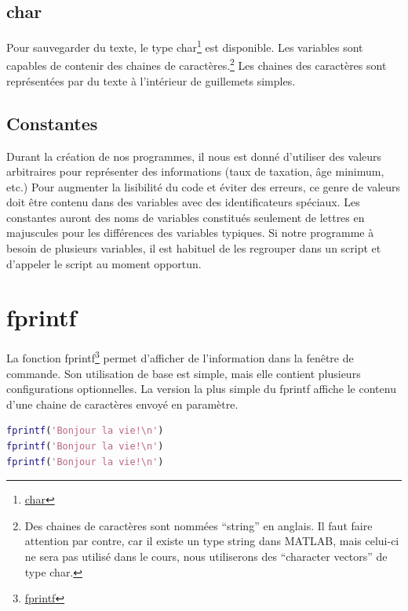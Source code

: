 \documentclass[]{tufte-handout}
\begin{document}
\hypertarget{char}{%
\subsection{char}\label{char}}

Pour sauvegarder du texte, le type char\footnote{\href{https://www.mathworks.com/help/matlab/ref/char.html}{char}}
est disponible. Les variables sont capables de contenir des chaines de
caractères.\footnote{Des chaines de caractères sont nommées ``string''
  en anglais. Il faut faire attention par contre, car il existe un type
  string dans MATLAB, mais celui-ci ne sera pas utilisé dans le cours,
  nous utiliserons des ``character vectors'' de type char.} Les chaines
des caractères sont représentées par du texte à l'intérieur de
guillemets simples.

\hypertarget{constantes}{%
\subsection{Constantes}\label{constantes}}

Durant la création de nos programmes, il nous est donné d'utiliser des
valeurs arbitraires pour représenter des informations (taux de taxation,
âge minimum, etc.) Pour augmenter la lisibilité du code et éviter des
erreurs, ce genre de valeurs doit être contenu dans des variables avec
des identificateurs spéciaux. Les constantes auront des noms de
variables constitués seulement de lettres en majuscules pour les
différences des variables typiques. Si notre programme à besoin de
plusieurs variables, il est habituel de les regrouper dans un script et
d'appeler le script au moment opportun.

\hypertarget{fprintf}{%
\section{fprintf}\label{fprintf}}

La fonction fprintf\footnote{\href{https://www.mathworks.com/help/matlab/ref/fprintf.html}{fprintf}}
permet d'afficher de l'information dans la fenêtre de commande. Son
utilisation de base est simple, mais elle contient plusieurs
configurations optionnelles. La version la plus simple du fprintf
affiche le contenu d'une chaine de caractères envoyé en paramètre.

\begin{lstlisting}[language=Matlab]
fprintf('Bonjour la vie!\n')
fprintf('Bonjour la vie!\n')
fprintf('Bonjour la vie!\n')
\end{lstlisting}
\end{document}
